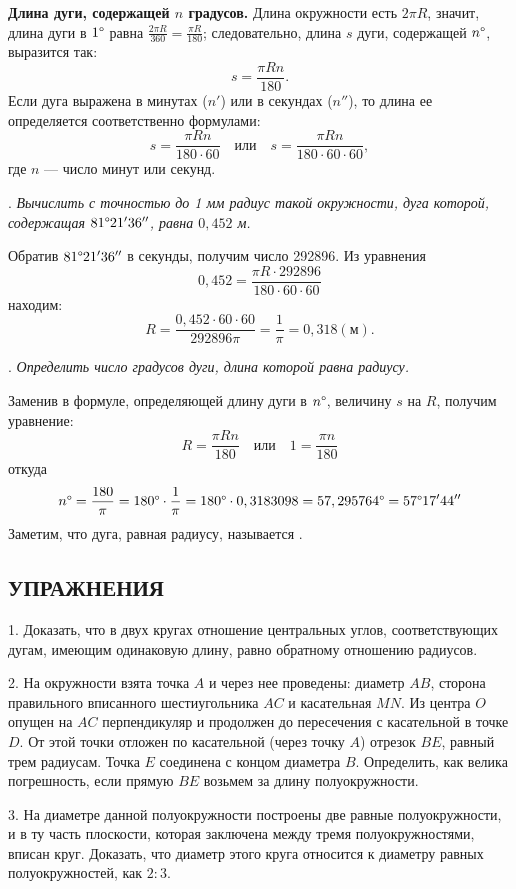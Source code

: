 \documentclass[oneside]{book}
\begin{document}
\textbf{Длина дуги, содержащей $n$ градусов.}
Длина окружности есть $2\pi R$, значит, длина дуги в $1\degree$ равна $\frac{2\pi R}{360}=\frac{\pi R}{180}$; следовательно, длина $s$ дуги, содержащей $n\degree$, выразится так:
\[s=\frac{\pi R n}{180}.\]
Если дуга выражена в минутах ($n'$) или в секундах ($n''$), то длина ее определяется соответственно формулами:
\[s=\frac{\pi R n}{180\cdot 60}
\quad\text{или}\quad
s=\frac{\pi R n}{180\cdot 60\cdot 60},\]
где $n$ — число минут или секунд.

.
\emph{Вычислить с точностью до 1 мм радиус такой окружности, дуга которой, содержащая $81\degree 21'36''$, равна $0{,}452$ м.}

Обратив $81\degree 21'36''$ в секунды, получим число 292896.
Из уравнения
\[0{,}452 = \frac{\pi R\cdot  292896}{180\cdot 60\cdot 60}\]
находим:
\[R=\frac{0{,}452\cdot 60\cdot 60}{292896\pi}=\frac1\pi=0{,}318 (\text{м}).\]

.
\emph{Определить число градусов дуги, длина которой равна радиусу.}

Заменив в формуле, определяющей длину дуги в $n\degree$, величину $s$ на $R$, получим уравнение:
\[R=\frac{\pi R n}{180}
\quad\text{или}\quad
1=\frac{\pi n}{180}\]
откуда
\[n\degree =\frac{180}\pi= 180\degree \cdot \frac1\pi = 180\degree \cdot 0,3183098 = 57,295764\degree = 57\degree17'44''\]
Заметим, что дуга, равная радиусу, называется .

\subsection*{УПРАЖНЕНИЯ}

1.
Доказать, что в двух кругах отношение центральных углов, соответствующих дугам, имеющим одинаковую длину, равно обратному отношению радиусов.

2.
На окружности взята точка $A$ и через нее проведены:
диаметр $AB$, сторона правильного вписанного шестиугольника $AC$ и касательная $MN$.
Из центра $O$ опущен на $AC$ перпендикуляр и продолжен до пересечения с касательной в точке $D$.
От этой точки отложен по касательной (через точку $A$) отрезок $BE$, равный трем радиусам.
Точка $E$ соединена с концом диаметра $B$.
Определить, как велика погрешность, если прямую $BE$ возьмем за длину полуокружности.

3.
На диаметре данной полуокружности построены две равные полуокружности, и в ту часть плоскости, которая заключена между тремя полуокружностями, вписан круг.
Доказать, что диаметр этого круга относится к диаметру равных полуокружностей, как $2:3$.
\end{document}
